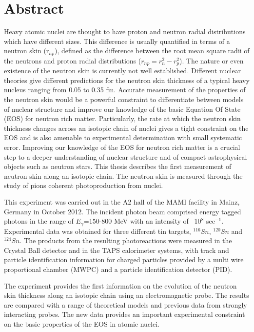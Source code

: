 \chapter*{Abstract}
\noindent

\indent Heavy atomic nuclei are thought to have proton and neutron radial distributions which have different sizes. This difference is usually quantified in terms of a neutron skin (r$_{np}$), defined as the difference between the root mean square radii of the neutrons and proton radial distributions ($r_{np} = r_{n}^{2} - r_{p}^{2}$). The nature or even existence of the neutron skin is currently not well established. Different nuclear theories give different predictions for the neutron skin thickness of a typical heavy nucleus ranging from 0.05 to 0.35 fm. Accurate measurement of the properties of the neutron skin would be a powerful constraint to differentiate between models of nuclear structure and improve our knowledge of the basic Equation Of State (EOS) for neutron rich matter. Particularly, the rate at which the neutron skin thickness changes across an isotopic chain of nuclei gives a tight constraint on the EOS and is also amenable to experimental determination with small systematic error. Improving our knowledge of the EOS for neutron rich matter is a crucial step to a deeper understanding of nuclear structure and of compact astrophysical objects such as neutron stars. This thesis describes the first measurement of neutron skin  along an isotopic chain. The neutron skin is measured through the study of pions coherent photoproduction from nuclei. 

\indent This experiment was carried out in the A2 hall of the MAMI facility in Mainz, Germany in October 2012.  The incident photon beam comprised energy tagged photons in the range of $E_{\gamma}$=150-800 MeV with an intensity of ~10$^{8}$ sec$^{-1}$. Experimental data was obtained for three different tin targets, $^{116}Sn$, $^{120}Sn$ and $^{124}Sn$. The products from the resulting photoreactions were measured in the Crystal Ball detector and in the TAPS calorimeter systems, with track and particle identification information for charged particles provided by a multi wire proportional chamber (MWPC) and a particle identification detector (PID).

\indent The experiment provides the first information on the evolution of the neutron skin thickness along an isotopic chain using an electromagnetic probe. The results are compared with a range of theoretical models and previous data from strongly interacting probes. The new data provides an important experimental constraint on the basic properties of the EOS in atomic nuclei.

\indent

\vspace{10mm}
\normalsize
